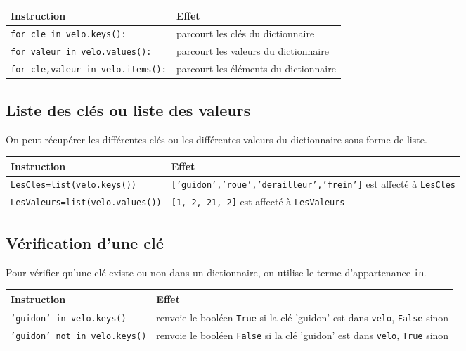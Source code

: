 \begin{center}
\begin{tabular}{|l|p{7cm}|}\hline Instruction & Effet \\
\hline
\texttt {for cle in velo.keys():} & parcourt les clés du dictionnaire\\
\hline
\texttt {for valeur in velo.values():} & parcourt les valeurs du dictionnaire\\
\hline
\texttt {for cle,valeur in velo.items():} & parcourt les éléments du dictionnaire\\
\hline
\end{tabular}
\end{center}


\subsection*{Liste des clés ou liste des valeurs}
On peut récupérer les différentes clés ou les différentes valeurs du dictionnaire sous forme de liste.

\begin{center}
\begin{tabular}{|l|p{10cm}|}\hline Instruction & Effet \\
\hline
\texttt {LesCles=list(velo.keys())} & \texttt{['guidon','roue','derailleur','frein']} est affecté à \texttt{LesCles}\\
\hline
\texttt {LesValeurs=list(velo.values())} & \texttt{[1, 2, 21, 2]} est affecté à \texttt{LesValeurs}\\
\hline
\end{tabular}
\end{center}


\subsection*{Vérification d'une clé}
Pour vérifier qu'une clé existe ou non dans un dictionnaire, on utilise le terme d'appartenance \texttt{in}.

\begin{center}
\begin{tabular}{|l|p{11cm}|}\hline Instruction & Effet \\
\hline
\texttt{'guidon' in velo.keys()} & renvoie le booléen \texttt{True} si la clé 'guidon' est dans \texttt{velo}, \texttt{False} sinon\\
\hline
\texttt{'guidon' not in velo.keys()} & renvoie le booléen \texttt{False} si la clé 'guidon' est dans \texttt{velo}, \texttt{True} sinon\\
\hline
\end{tabular}
\end{center}

